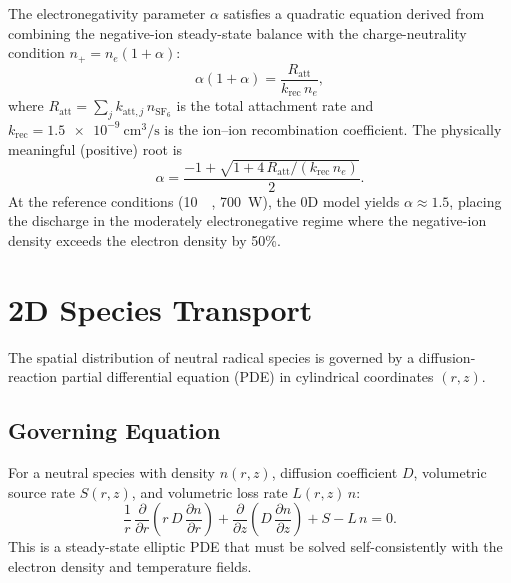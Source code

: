 \documentclass[11pt,a4paper]{report}
\newcommand{\SFsix}{\mathrm{SF}_6}
\begin{document}
The electronegativity parameter $\alpha$ satisfies a quadratic equation derived from combining the negative-ion steady-state balance with the charge-neutrality condition $n_+ = n_e(1+\alpha)$:
\begin{equation}
  \boxed{\alpha(1+\alpha) = \frac{R_\mathrm{att}}{k_\mathrm{rec}\,n_e},}
  \label{eq:alpha-quadratic-full}
\end{equation}
where $R_\mathrm{att} = \sum_j k_{\mathrm{att},j}\,n_{\SFsix}$ is the total attachment rate and $k_\mathrm{rec} = \SI{1.5e-9}{\centi\meter\cubed\per\second}$ is the ion--ion recombination coefficient.  The physically meaningful (positive) root is
\begin{equation}
  \alpha = \frac{-1 + \sqrt{1 + 4\,R_\mathrm{att}/(k_\mathrm{rec}\,n_e)}}{2}.
  \label{eq:alpha-root}
\end{equation}
At the reference conditions (\SI{10}{\milli\torr}, \SI{700}{\watt}), the 0D model yields $\alpha \approx 1.5$, placing the discharge in the moderately electronegative regime where the negative-ion density exceeds the electron density by 50\%.


\section{2D Species Transport}
\label{sec:species-transport}

The spatial distribution of neutral radical species is governed by a diffusion-reaction partial differential equation (PDE) in cylindrical coordinates $(r, z)$.

\subsection{Governing Equation}

For a neutral species with density $n(r,z)$, diffusion coefficient $D$, volumetric source rate $S(r,z)$, and volumetric loss rate $L(r,z)\,n$:
\begin{equation}
  \boxed{\frac{1}{r}\,\frac{\partial}{\partial r}\!\left(r\,D\,\frac{\partial n}{\partial r}\right)
  + \frac{\partial}{\partial z}\!\left(D\,\frac{\partial n}{\partial z}\right)
  + S - L\,n = 0.}
  \label{eq:diffusion-reaction}
\end{equation}
This is a steady-state elliptic PDE that must be solved self-consistently with the electron density and temperature fields.
\end{document}
